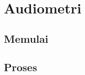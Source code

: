 \documentclass[12pt,]{article}
\begin{document}
	\newpage
	\section{Audiometri}
	
	\subsection{Memulai}
	
	\subsection{Proses}
	
\end{document}
